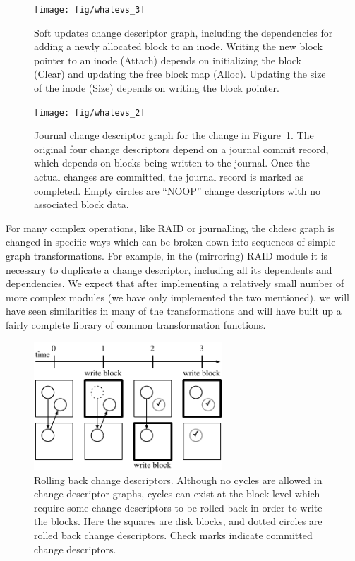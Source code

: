 \begin{figure}[b]
  \centering
  \texttt{[image: fig/whatevs\_3]}%
  \caption{\label{fig:softupdates} Soft updates change descriptor graph,
  including the dependencies for adding a newly allocated block to an
  inode. Writing the new block pointer to an inode (Attach) depends on
  initializing the block (Clear) and updating the free block map (Alloc).
  Updating the size of the inode (Size) depends on writing the block
  pointer.}
\end{figure}

\begin{figure}
  \centering
  \texttt{[image: fig/whatevs\_2]}%
  \caption{\label{fig:journal} Journal change descriptor graph for the
  change in Figure~\ref{fig:softupdates}.  The original four change
  descriptors depend on a journal commit record, which depends on blocks
  being written to the journal.  Once the actual changes are committed, the
  journal record is marked as completed.  Empty circles are ``NOOP'' change
  descriptors with no associated block data.  }
\end{figure}

For many complex operations, like RAID or journalling, the chdesc graph is
changed in specific ways which can be broken down into sequences of simple graph
transformations. For example, in the (mirroring) RAID module it is necessary to
duplicate a change descriptor, including all its dependents and dependencies. We
expect that after implementing a relatively small number of more complex modules
(we have only implemented the two mentioned), we will have seen similarities in
many of the transformations and will have built up a fairly complete library of
common transformation functions.

\begin{figure}
  \centering
  \includegraphics[width=200pt]{rollback_sequence}
  \caption{\label{fig:rollback} Rolling back change descriptors. Although no
  cycles are allowed in change descriptor graphs, cycles can exist at the block
  level which require some change descriptors to be rolled back in order to
  write the blocks. Here the squares are disk blocks, and dotted circles are
  rolled back change descriptors. Check marks indicate committed change
  descriptors.
}
\end{figure}
